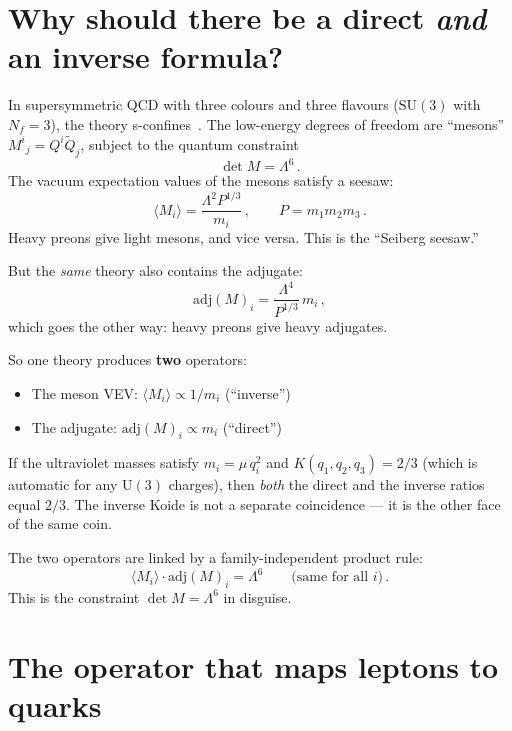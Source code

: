 \documentclass[11pt,a4paper]{article}
\begin{document}
\section{Why should there be a direct \emph{and} an inverse formula?}

In supersymmetric QCD with three colours and three flavours
($\mathrm{SU}(3)$ with $N_f = 3$), the theory
s-confines~\cite{Seiberg:1995}.
The low-energy degrees of freedom are ``mesons''
$M^i{}_j = Q^i \tilde{Q}_j$, subject to the quantum constraint
\begin{equation}
  \det M = \Lambda^6\,.
\end{equation}
The vacuum expectation values of the mesons satisfy a seesaw:
\begin{equation}
  \langle M_i \rangle = \frac{\Lambda^2 P^{1/3}}{m_i}\,,
  \qquad P = m_1 m_2 m_3\,.
\end{equation}
Heavy preons give light mesons, and vice versa.
This is the ``Seiberg seesaw.''

But the \emph{same} theory also contains the adjugate:
\begin{equation}
  \mathrm{adj}(M)_i = \frac{\Lambda^4}{P^{1/3}}\,m_i\,,
\end{equation}
which goes the other way: heavy preons give heavy adjugates.

So one theory produces \textbf{two} operators:
\begin{itemize}
  \item The meson VEV: $\langle M_i \rangle \propto 1/m_i$
    (``inverse'')
  \item The adjugate: $\mathrm{adj}(M)_i \propto m_i$ (``direct'')
\end{itemize}
If the ultraviolet masses satisfy $m_i = \mu\,q_i^2$ and
$K(q_1, q_2, q_3) = 2/3$ (which is automatic for any
$\mathrm{U}(3)$ charges), then \emph{both} the direct and the
inverse ratios equal $2/3$.
The inverse Koide is not a separate coincidence --- it is the
other face of the same coin.

The two operators are linked by a family-independent product rule:
\begin{equation}
  \langle M_i \rangle \cdot \mathrm{adj}(M)_i
  = \Lambda^6 \qquad \text{(same for all } i\text{)}\,.
\end{equation}
This is the constraint $\det M = \Lambda^6$ in disguise.


\section{The operator that maps leptons to quarks}
\end{document}
